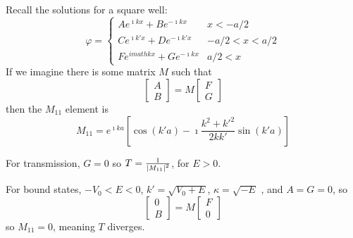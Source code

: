 \documentclass[a4paper,twoside,master.tex]{subfiles}
\begin{document}
Recall the solutions for a square well:
\begin{equation}
    \varphi = \begin{cases}
    A e^{\imath k x} + B e^{-\imath k x} & x < -a/2\\
    C e^{\imath k' x} + D e^{-\imath k' x} & -a/2 < x < a/2\\
    F e^{imath k x} + G e^{-\imath k x} & a/2 < x
\end{cases}
\end{equation}
If we imagine there is some matrix $ M $ such that
\begin{equation}
    \begin{bmatrix}
        A\\B
    \end{bmatrix}
    = M 
    \begin{bmatrix}
        F\\G
    \end{bmatrix}
\end{equation}
then the $ M_{11} $ element is
\begin{equation}
    M_{11} = e^{\imath k a} \left[ \cos(k'a) - \imath \frac{k^2 + k'^2}{2kk'} \sin(k'a) \right]
\end{equation}

For transmission, $ G = 0 $ so $ T = \frac{1}{\abs{M_{11}}^2} $, for $ E>0 $.

For bound states, $ -V_0 < E < 0 $, $ k' = \sqrt{V_0 + E} $, $ \kappa = \sqrt{- E} $ , and $ A = G = 0 $, so
\begin{equation}
    \begin{bmatrix}
        0\\B
    \end{bmatrix}
    = M 
    \begin{bmatrix}
        F\\0
    \end{bmatrix}
\end{equation}
so $ M_{11} = 0 $, meaning $ T $ diverges.
\end{document}
